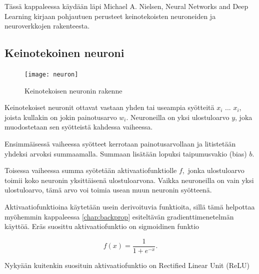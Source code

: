 \documentclass[finnish]{tktltiki2}
\theoremstyle{definition}
\theoremstyle{remark}
\begin{document}
  Tässä kappaleessa käydään läpi Michael A. Nielsen, Neural Networks and Deep Learning \cite{Nielsen-neural} kirjaan pohjautuen perusteet keinotekoisten neuroneiden ja neuroverkkojen rakenteesta. 

  \subsection{Keinotekoinen neuroni}
    \label{chap:artificial-neuron}

    \begin{figure}[h]
      \centering
      \texttt{[image: neuron]}
      \caption{Keinotekoisen neuronin rakenne}
      \label{pic:neuron}
    \end{figure}

    Keinotekoiset neuronit ottavat vastaan yhden tai useampia syötteitä $x_i$ ... $x_i$, joista kullakin on jokin painotusarvo $w_i$. Neuroneilla on yksi ulostuloarvo $y$, joka muodostetaan sen syötteistä kahdessa vaiheessa.

    Ensimmäisessä vaiheessa syötteet kerrotaan painotusarvollaan ja litistetään yhdeksi arvoksi summaamalla. Summaan lisätään lopuksi taipumusvakio (bias) $b$.

    Toisessa vaiheessa summa syötetään aktivaatiofunktiolle $f$, jonka ulostuloarvo toimii koko neuronin yksittäisenä ulostuloarvona. Vaikka neuroneilla on vain yksi ulostuloarvo, tämä arvo voi toimia usean muun neuronin syötteenä.

    Aktivaatiofunktioina käytetään usein derivoituvia funktioita, sillä tämä helpottaa myöhemmin kappaleessa \ref{chap:backprop} esiteltävän gradienttimenetelmän käyttöä. Eräs suosittu aktivaatiofunktio on sigmoidinen funktio

    \begin{equation}
      f(x) = \frac{1}{1 + e^{-x}}.
      \label{eq:sigmoid-func}
    \end{equation}

    \noindent Nykyään kuitenkin suosituin aktivaatiofunktio on Rectified Linear Unit (ReLU)
\end{document}
